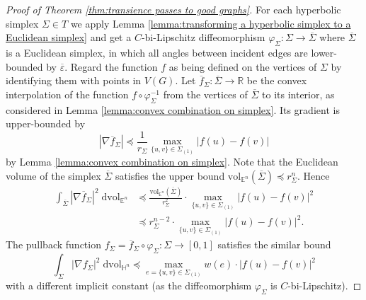 \documentclass{amsart}
\newcommand{\RR}{\mathbb{R}}
\newcommand{\HH}{\mathbb{H}}
\newcommand{\EE}{\mathbb{E}}
\theoremstyle{plain}
\numberwithin{equation}{section}
\theoremstyle{definition}
\begin{document}
\begin{proof}[Proof of Theorem \ref{thm:transience passes to good graphs}]
For each hyperbolic simplex $\Sigma \in T$ we apply Lemma \ref{lemma:transforming a hyperbolic simplex to a Euclidean simplex} and get a $C$-bi-Lipschitz diffeomorphism  $\varphi_\Sigma : \Sigma \to \overline{\Sigma}$ where $\overline{\Sigma}$ is a Euclidean simplex, in which all angles between incident edges are lower-bounded by $\overline{\varepsilon}$. Regard the function $f$ as being defined on the vertices of $\Sigma$ by identifying them with points in $V(G)$. Let $\overline f_\Sigma : \overline{\Sigma} \to \RR$ be the convex interpolation of the function $f \circ \varphi^{-1}_\Sigma$ from the vertices of $\overline{\Sigma}$ to its interior, as considered in Lemma \ref{lemma:convex combination on simplex}. Its gradient  is upper-bounded by 
$$ |\nabla  \overline f_\Sigma| \preceq \frac{1}{r_\Sigma}  \max_{\{u,v\}\in \Sigma_{(1)}} |f(u)-f(v)|$$
by Lemma \ref{lemma:convex combination on simplex}. 
Note that the Euclidean volume  of the simplex $ \overline{\Sigma}$ satisfies the upper bound  $\mathrm{vol}_{\EE^n}(\overline \Sigma) \preceq r_\Sigma^n$. Hence 
\begin{align*} 
\int_{\overline{\Sigma}} |\nabla  \overline f_\Sigma |^2 \; \mathrm{dvol}_{\EE^n} &\preceq  \frac{ \mathrm{vol}_{\EE^n}(\overline \Sigma) }{r_\Sigma^2} \cdot \max_{\{u,v\} \in \Sigma_{(1)}} | f(u)-f(v)|^2\\
&\preceq r_\Sigma^{n-2}\cdot \max_{\{u,v\} \in \Sigma_{(1)}} | f(u)-f(v)|^2.
\end{align*}
The pullback function $f_\Sigma = \overline f_\Sigma \circ \varphi_\Sigma: \Sigma \to \left[0,1\right] $ satisfies the similar  bound  
$$\int_\Sigma |\nabla f_\Sigma|^2 \; \mathrm{dvol}_{\HH^n} \preceq  \max_{e=\{u,v\} \in \Sigma_{(1)}} w(e) \cdot| f(u)-f(v)|^2$$
with a different implicit constant  (as the diffeomorphism $\varphi_\Sigma$ is $C$-bi-Lipschitz). 


\end{proof}
\end{document}
